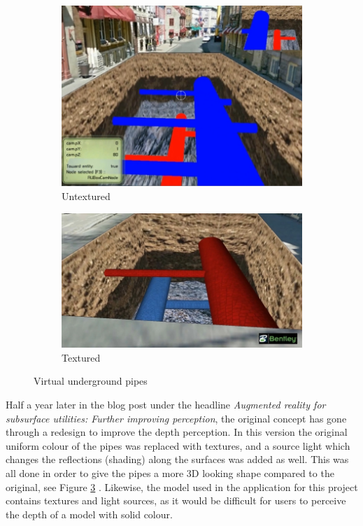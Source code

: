 \begin{figure}
	\centering
	\begin{subfigure}[h!]{\textwidth}
		\includegraphics[width=\textwidth]{figures/pipes_0.jpg}
		\caption{Untextured}\label{fig:pipes0}
	\end{subfigure}
	\begin{subfigure}[h!]{\textwidth}
		\includegraphics[width=\textwidth]{figures/pipes_1.jpg}
		\caption{Textured}\label{fig:pipes1}
	\end{subfigure}
	\caption{Virtual underground pipes \cite{Cote2011}}
\end{figure}

Half a year later in the blog post under the headline \textit{Augmented reality for subsurface utilities: Further improving perception}, the original concept has gone through a redesign to improve the depth perception. In this version the original uniform colour of the pipes was replaced with textures, and a source light which changes the reflections (shading) along the surfaces was added as well. This was all done in order to give the pipes a more 3D looking shape compared to the original, see Figure \ref{fig:pipes1} \cite{Cote2011}. Likewise, the model used in the application for this project contains textures and light sources, as it would be difficult for users to perceive the depth of a model with solid colour.

